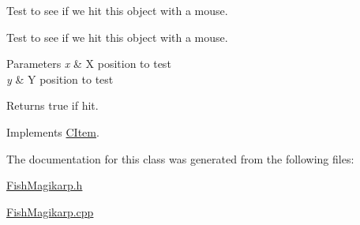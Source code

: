 Test to see if we hit this object with a mouse. 

Test to see if we hit this object with a mouse. 
\begin{DoxyParams}{Parameters}
{\em x} & X position to test \\
\hline
{\em y} & Y position to test \\
\hline
\end{DoxyParams}
\begin{DoxyReturn}{Returns}
true if hit. 
\end{DoxyReturn}


Implements \hyperlink{class_c_item_a8bd4f5e3f2eb2487125dd435719484e8}{C\+Item}.



The documentation for this class was generated from the following files\+:\begin{DoxyCompactItemize}
\item 
\hyperlink{_fish_magikarp_8h}{Fish\+Magikarp.\+h}\item 
\hyperlink{_fish_magikarp_8cpp}{Fish\+Magikarp.\+cpp}\end{DoxyCompactItemize}
